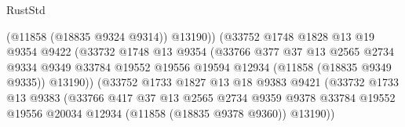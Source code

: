 \begin{lexlean}{RustStd}
\begin{coremodule}
                                        (@11858 (@18835 @9324 @9314))
                                        @13190))
                                    (@33752
                                      @1748
                                      @1828
                                      @13
                                      @19
                                      @9354
                                      @9422
                                      (@33732
                                        @1748
                                        @13
                                        @9354
                                        (@33766
                                          @377
                                          @37
                                          @13
                                          @2565
                                          @2734
                                          @9334
                                          @9349
                                          @33784
                                          @19552
                                          @19556
                                          @19594
                                          @12934
                                          (@11858 (@18835 @9349 @9335))
                                          @13190))
                                      (@33752
                                        @1733
                                        @1827
                                        @13
                                        @18
                                        @9383
                                        @9421
                                        (@33732
                                          @1733
                                          @13
                                          @9383
                                          (@33766
                                            @417
                                            @37
                                            @13
                                            @2565
                                            @2734
                                            @9359
                                            @9378
                                            @33784
                                            @19552
                                            @19556
                                            @20034
                                            @12934
                                            (@11858 (@18835 @9378 @9360))
                                            @13190))

\end{coremodule}
\end{lexlean}
